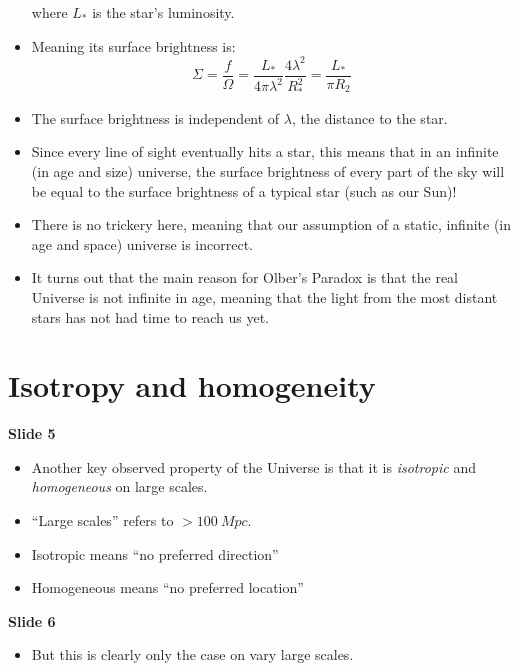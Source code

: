\documentclass[11pt]{article}
\begin{document}
\begin{itemize}
  where $L_\ast$ is the star's luminosity.
  \item Meaning its surface brightness is:
  \begin{equation}
  \Sigma = \frac{f}{\Omega}=\frac{L_\ast}{4\pi \lambda^2}\frac{4\lambda^2}{R_\ast^2} = \frac{L_\ast}{\pi R_2}
  \end{equation}
  \item The surface brightness is independent of $\lambda$, the distance to the star.
  \item Since every line of sight eventually hits a star, this means that in an infinite (in age and size) universe, the surface brightness of every part of the sky will be equal to the surface brightness of a typical star (such as our Sun)!
  \item There is no trickery here, meaning that our assumption of a static, infinite (in age and space) universe is incorrect.
  \item It turns out that the main reason for Olber's Paradox is that the real Universe is not infinite in age, meaning that the light from the most distant stars has not had time to reach us yet.
\end{itemize}

\section{Isotropy and homogeneity}
{\bf Slide 5}
\begin{itemize}
\item Another key observed property of the Universe is that it is {\it isotropic} and {\it homogeneous} on large scales.
\item ``Large scales'' refers to $>100~Mpc$.
\item Isotropic means ``no preferred direction''
\item Homogeneous means ``no preferred location''
\end{itemize}

\vspace{3mm}
\noindent
{\bf Slide 6}
\begin{itemize}
\item But this is clearly only the case on vary large scales.
\end{itemize}
\end{document}
